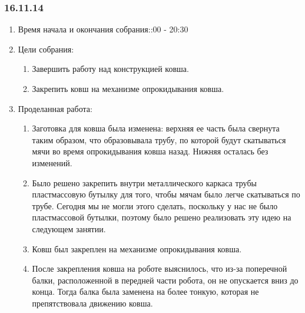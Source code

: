 
\subsubsection{16.11.14}

\begin{enumerate} 
	\item Время начала и окончания собрания::00 - 20:30
	\item Цели собрания:
	\begin{enumerate}
		\item Завершить работу над конструкцией ковша.
		
		\item Закрепить ковш на механизме опрокидывания ковша.
		
	\end{enumerate}
	
	\item Проделанная работа:
	\begin{enumerate}
		\item Заготовка для ковша была изменена: верхняя ее часть была свернута таким образом, что образовывала трубу, по которой будут скатываться мячи во время опрокидывания ковша назад. Нижняя осталась без изменений.
		
		\item Было решено закрепить внутри металлического каркаса трубы пластмассовую бутылку для того, чтобы мячам было легче скатываться по трубе. Сегодня мы не могли этого сделать, поскольку у нас не было пластмассовой бутылки, поэтому было решено реализовать эту идею на следующем занятии.
		
		\item Ковш был закреплен на механизме опрокидывания ковша.
		
		\item После закрепления ковша на роботе выяснилось, что из-за поперечной балки, расположенной в передней части робота, он не опускается вниз до конца. Тогда балка была заменена на более тонкую, которая не препятствовала движению ковша.
		

\end{enumerate}
\end{enumerate}
